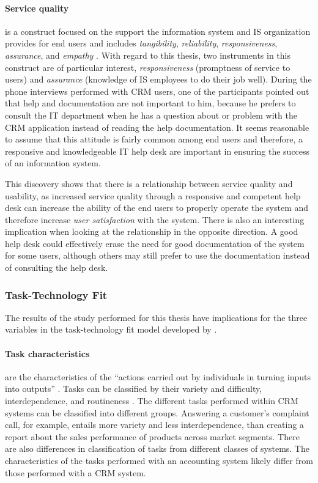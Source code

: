 \paragraph{Service quality} is a construct focused on the support the information system and IS organization provides for end users and includes \textit{tangibility}, \textit{reliability}, \textit{responsiveness}, \textit{assurance}, and \textit{empathy} \citep{DeLone2003}. With regard to this thesis, two instruments in this construct are of particular interest, \textit{responsiveness} (promptness of service to users) and \textit{assurance} (knowledge of IS employees to do their job well). During the phone interviews performed with CRM users, one of the participants pointed out that help and documentation are not important to him, because he prefers to consult the IT department when he has a question about or problem with the CRM application instead of reading the help documentation. It seems reasonable to assume that this attitude is fairly common among end users and therefore, a responsive and knowledgeable IT help desk are important in ensuring the success of an information system.

This discovery shows that there is a relationship between service quality and usability, as increased service quality through a responsive and competent help desk can increase the ability of the end users to properly operate the system and therefore increase \textit{user satisfaction} with the system. There is also an interesting implication when looking at the relationship in the opposite direction. A good help desk could effectively erase the need for good documentation of the system for some users, although others may still prefer to use the documentation instead of consulting the help desk.

\subsubsection{Task-Technology Fit}
The results of the study performed for this thesis have implications for the three variables in the task-technology fit model developed by \citet{Goodhue1995}.

\paragraph{Task characteristics} are the characteristics of the ``actions carried out by individuals in turning inputs into outputs'' \citep{Goodhue1995}. Tasks can be classified by their variety and difficulty, interdependence, and routineness \citep{Goodhue1995}. The different tasks performed within CRM systems can be classified into different groups. Answering a customer's complaint call, for example, entails more variety and less interdependence, than creating a report about the sales performance of products across market segments. There are also differences in classification of tasks from different classes of systems. The characteristics of the tasks performed with an accounting system likely differ from those performed with a CRM system.

